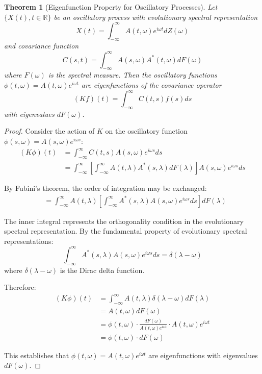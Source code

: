 \documentclass{article}
\newtheorem{theorem}{Theorem}
\begin{document}
\begin{theorem}[Eigenfunction Property for Oscillatory Processes]
Let $\{X(t), t \in \mathbb{R}\}$ be an oscillatory process with evolutionary spectral representation
\begin{equation}
X(t) = \int_{-\infty}^{\infty} A(t,\omega)e^{i\omega t} dZ(\omega)
\end{equation}
and covariance function
\begin{equation}
C(s,t) = \int_{-\infty}^{\infty} A(s,\omega)A^*(t,\omega) dF(\omega)
\end{equation}
where $F(\omega)$ is the spectral measure. Then the oscillatory functions $\phi(t,\omega) = A(t,\omega)e^{i\omega t}$ are eigenfunctions of the covariance operator
\begin{equation}
(Kf)(t) = \int_{-\infty}^{\infty} C(t,s)f(s)ds
\end{equation}
with eigenvalues $dF(\omega)$.
\end{theorem}

\begin{proof}
Consider the action of $K$ on the oscillatory function $\phi(s,\omega) = A(s,\omega)e^{i\omega s}$:
\begin{align}
(K\phi)(t) &= \int_{-\infty}^{\infty} C(t,s)A(s,\omega)e^{i\omega s} ds \\
&= \int_{-\infty}^{\infty} \left[\int_{-\infty}^{\infty} A(t,\lambda)A^*(s,\lambda) dF(\lambda)\right] A(s,\omega)e^{i\omega s} ds
\end{align}

By Fubini's theorem, the order of integration may be exchanged:
\begin{align}
&= \int_{-\infty}^{\infty} A(t,\lambda) \left[\int_{-\infty}^{\infty} A^*(s,\lambda)A(s,\omega)e^{i\omega s} ds\right] dF(\lambda)
\end{align}

The inner integral represents the orthogonality condition in the evolutionary spectral representation. By the fundamental property of evolutionary spectral representations:
\begin{equation}
\int_{-\infty}^{\infty} A^*(s,\lambda)A(s,\omega)e^{i\omega s} ds = \delta(\lambda - \omega)
\end{equation}
where $\delta(\lambda - \omega)$ is the Dirac delta function.

Therefore:
\begin{align}
(K\phi)(t) &= \int_{-\infty}^{\infty} A(t,\lambda) \delta(\lambda - \omega) dF(\lambda) \\
&= A(t,\omega) dF(\omega) \\
&= \phi(t,\omega) \cdot \frac{dF(\omega)}{A(t,\omega)e^{i\omega t}} \cdot A(t,\omega)e^{i\omega t} \\
&= \phi(t,\omega) \cdot dF(\omega)
\end{align}

This establishes that $\phi(t,\omega) = A(t,\omega)e^{i\omega t}$ are eigenfunctions with eigenvalues $dF(\omega)$.
\end{proof}
\end{document}
